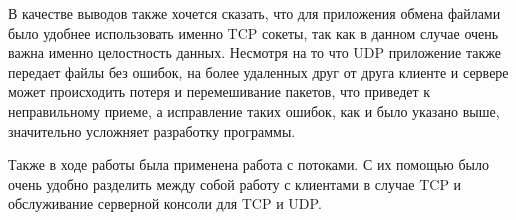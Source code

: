 В качестве выводов также хочется сказать, что для приложения обмена файлами было удобнее использовать именно TCP сокеты, так как в данном случае очень важна именно целостность данных. Несмотря на то что UDP приложение также передает файлы без ошибок, на более удаленных друг от друга клиенте и сервере может происходить потеря и перемешивание пакетов, что приведет к неправильному приеме, а исправление таких ошибок, как и было указано выше, значительно усложняет разработку программы.

Также в ходе работы была применена работа с потоками. С их помощью было очень удобно разделить между собой работу с клиентами в случае TCP и обслуживание серверной консоли для TCP и UDP.

